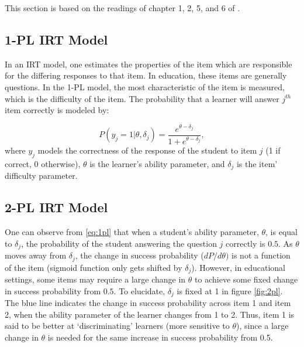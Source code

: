 \documentclass[12pt]{article}
\begin{document}
This section is based on the readings of chapter 1, 2, 5, and 6 of \cite{de2013theory}.

\subsection{1-PL IRT Model}
In an IRT model, one estimates the properties of the item which are responsible for the differing responses to that item. In education, these items are generally questions. In the 1-PL model, the most characteristic of the item is measured, which is the difficulty of the item. The probability that a learner will answer $j^{th}$ item correctly is modeled by:

\begin{equation}\label{eq:1pl}
    P(y_j=1|\theta, \delta_j) = \frac{e^{\theta - \delta_j}}{1+e^{\theta - \delta_j}},
\end{equation}
where $y_j$ models the correctness of the response of the student to item $j$ (1 if correct, 0 otherwise),  $\theta$ is the learner's ability parameter, and $\delta_j$ is the item' difficulty parameter.

\subsection{2-PL IRT Model}
One can observe from \eqref{eq:1pl} that when a student's ability parameter, $\theta$, is equal to $\delta_j$, the probability of the student answering the question $j$ correctly is $0.5$. As $\theta$ moves away from $\delta_j$, the change in success probability ($dP/ d\theta) $ is not a function of the item (sigmoid function only gets shifted by $\delta_j$). However, in educational settings, some items may require a large change in $\theta$ to achieve some fixed change in success probability from $0.5$. To elucidate, $\delta_j$ is fixed at 1 in figure \ref{fig:2pl}. The blue line indicates the change in success probability across item 1 and item 2, when the ability parameter of the learner changes from 1 to 2. Thus, item 1 is said to be better at `discriminating' learners (more sensitive to $\theta$), since a large change in $\theta$ is needed for the same increase in success probability from 0.5.
\end{document}
